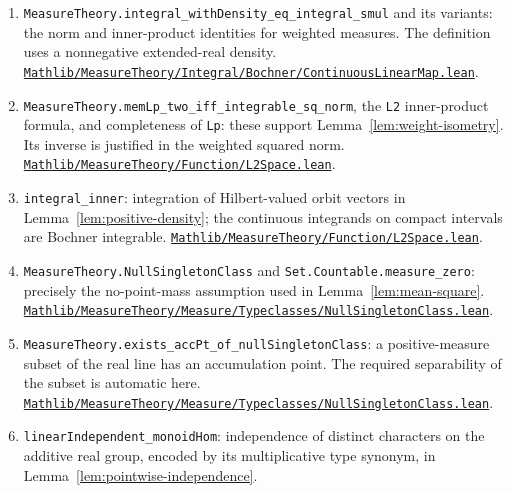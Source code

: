 \documentclass[reqno,a4paper,12pt]{amsart}
\theoremstyle{definition}
\newcommand{\ml}[1]{\nolinkurl{#1}}
\begin{document}
\begin{enumerate}
\href{https://github.com/leanprover-community/mathlib4/blob/1ddfaa9548e05b343be9248ae08b73c3425b446e/Mathlib/MeasureTheory/Integral/Prod.lean#L443}{\ml{Mathlib/MeasureTheory/Integral/Prod.lean}}.
\item \ml{MeasureTheory.integral_withDensity_eq_integral_smul} and its variants: the norm and inner-product identities for weighted measures. The definition uses a nonnegative extended-real density.
\href{https://github.com/leanprover-community/mathlib4/blob/1ddfaa9548e05b343be9248ae08b73c3425b446e/Mathlib/MeasureTheory/Integral/Bochner/ContinuousLinearMap.lean#L251}{\ml{Mathlib/MeasureTheory/Integral/Bochner/ContinuousLinearMap.lean}}.
\item \ml{MeasureTheory.memLp_two_iff_integrable_sq_norm}, the \ml{L2} inner-product formula, and completeness of \ml{Lp}: these support Lemma~\ref{lem:weight-isometry}. Its inverse is justified in the weighted squared norm.
\href{https://github.com/leanprover-community/mathlib4/blob/1ddfaa9548e05b343be9248ae08b73c3425b446e/Mathlib/MeasureTheory/Function/L2Space.lean#L45}{\ml{Mathlib/MeasureTheory/Function/L2Space.lean}}.
\item \ml{integral_inner}: integration of Hilbert-valued orbit vectors in Lemma~\ref{lem:positive-density}; the continuous integrands on compact intervals are Bochner integrable.
\href{https://github.com/leanprover-community/mathlib4/blob/1ddfaa9548e05b343be9248ae08b73c3425b446e/Mathlib/MeasureTheory/Function/L2Space.lean#L89}{\ml{Mathlib/MeasureTheory/Function/L2Space.lean}}.
\item \ml{MeasureTheory.NullSingletonClass} and \ml{Set.Countable.measure_zero}: precisely the no-point-mass assumption used in Lemma~\ref{lem:mean-square}.
\href{https://github.com/leanprover-community/mathlib4/blob/1ddfaa9548e05b343be9248ae08b73c3425b446e/Mathlib/MeasureTheory/Measure/Typeclasses/NullSingletonClass.lean#L28}{\ml{Mathlib/MeasureTheory/Measure/Typeclasses/NullSingletonClass.lean}}.
\item \ml{MeasureTheory.exists_accPt_of_nullSingletonClass}: a positive-measure subset of the real line has an accumulation point. The required separability of the subset is automatic here.
\href{https://github.com/leanprover-community/mathlib4/blob/1ddfaa9548e05b343be9248ae08b73c3425b446e/Mathlib/MeasureTheory/Measure/Typeclasses/NullSingletonClass.lean#L88}{\ml{Mathlib/MeasureTheory/Measure/Typeclasses/NullSingletonClass.lean}}.
\item \ml{linearIndependent_monoidHom}: independence of distinct characters on the additive real group, encoded by its multiplicative type synonym, in Lemma~\ref{lem:pointwise-independence}.

\end{enumerate}
\end{document}
